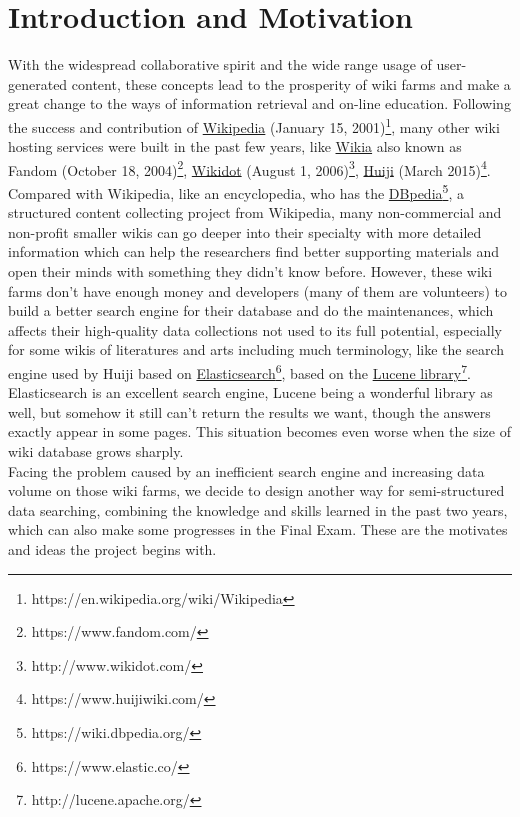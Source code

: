 \chapter{Introduction and Motivation}
\label{Ch-1:Sec:Introduction}

With the widespread collaborative spirit and the wide range usage of user-generated content, these concepts lead to the prosperity of wiki farms and make a great change to the ways of information retrieval and on-line education. Following the success and contribution of \href{https://en.wikipedia.org/wiki/Wikipedia}{Wikipedia} (January 15, 2001)\footnote{https://en.wikipedia.org/wiki/Wikipedia}, many other wiki hosting services were built in the past few years, like \href{https://www.fandom.com/}{Wikia} also known as Fandom (October 18, 2004)\footnote{https://www.fandom.com/}, \href{http://www.wikidot.com/}{Wikidot} (August 1, 2006)\footnote{http://www.wikidot.com/}, \href{https://www.huijiwiki.com/}{Huiji} (March 2015)\footnote{https://www.huijiwiki.com/}.\\ 
Compared with Wikipedia, like an encyclopedia, who has the \href{https://wiki.dbpedia.org/}{DBpedia}\footnote{https://wiki.dbpedia.org/}, a structured content collecting project from Wikipedia, many non-commercial and non-profit smaller wikis can go deeper into their specialty with more detailed information which can help the researchers find better supporting materials and open their minds with something they didn't know before. 
However, these wiki farms don't have enough money and developers (many of them are volunteers) to build a better search engine for their database and do the maintenances, which affects their high-quality data collections not used to its full potential, especially for some wikis of literatures and arts including much terminology, like the search engine used by Huiji based on \href{https://www.elastic.co/}{Elasticsearch}\footnote{https://www.elastic.co/}, based on the \href{http://lucene.apache.org/}{Lucene library}\footnote{http://lucene.apache.org/}. Elasticsearch is an excellent search engine, Lucene being a wonderful library as well, but somehow it still can't return the results we want, though the answers exactly appear in some pages. This situation becomes even worse when the size of wiki database grows sharply. \\
Facing the problem caused by an inefficient search engine and increasing data volume on those wiki farms, we decide to design another way for semi-structured data searching, combining the knowledge and skills learned in the past two years, which can also make some progresses in the Final Exam. These are the motivates and ideas the project begins with.\\
